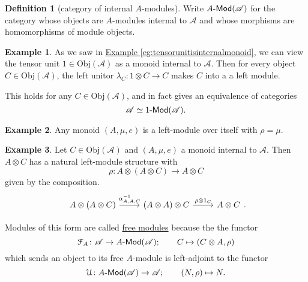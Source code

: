 \documentclass[a4paper,10pt]{scrreprt}
\newcommand{\defn}[1]{\ul{#1}}
\newcommand{\Obj}{\mathrm{Obj}}
\def\mhyp{{\hbox{-}}}
\theoremstyle{definition}
\newtheorem{definition}{Definition}[section]
\newtheorem{example}{Example}[section]
\theoremstyle{plain}
\theoremstyle{remark}
\begin{document}
\begin{definition}[category of internal $A$-modules]
  \label{def:categoryofinternalmodules}
  Write $A\mhyp\mathsf{Mod}(\mathscr{A})$ for the category whose objects are $A$-modules internal to $\mathscr{A}$ and whose morphisms are homomorphisms of module objects.
\end{definition}

\begin{example}
  \label{eg:categoryof1modulesisequivalenttocategoryitself}
  As we saw in \hyperref[eg:tensorunitisinternalmonoid]{Example \ref*{eg:tensorunitisinternalmonoid}}, we can view the tensor unit $1 \in \Obj(\mathscr{A})$ as a monoid internal to $\mathscr{A}$. Then for every object $C \in \Obj(\mathscr{A})$, the left unitor $\lambda_{C}\colon 1 \otimes C \to C$ makes $C$ into a a left module.

  This holds for any $C \in \Obj(\mathscr{A})$, and in fact gives an equivalence of categories
  \begin{equation*}
    \mathscr{A} \simeq 1\mhyp\mathsf{Mod}(\mathscr{A}).
  \end{equation*}
\end{example}

\begin{example}
  \label{eg:anyringisamoduleoveritself}
  Any monoid $(A, \mu, e)$ is a left-module over itself with $\rho = \mu$.
\end{example}

\begin{example}
  \label{eg:freemodule}
  Let $C \in \Obj(\mathscr{A})$ and $(A, \mu, e)$ a monoid internal to $\mathscr{A}$. Then $A \otimes C$ has a natural left-module structure with
  \begin{equation*}
    \rho\colon A \otimes (A \otimes C) \to A \otimes C
  \end{equation*}
  given by the composition.
  \begin{equation*}
    \begin{tikzcd}
      A \otimes (A \otimes C)
      \arrow[r, "{\alpha_{A, A ,C}^{-1}}"]
      & (A \otimes A) \otimes C
      \arrow[r, "\rho \otimes 1_{C}"]
      & A \otimes C
    \end{tikzcd}.
  \end{equation*}

  Modules of this form are called \defn{free modules} because the the functor 
  \begin{equation*}
    \mathcal{F}_{A}\colon \mathscr{A} \to A\mhyp\mathsf{Mod}(\mathscr{A});\qquad C \mapsto (C \otimes A, \rho)
  \end{equation*}
  which sends an object to its free $A$-module is left-adjoint to the functor 
  \begin{equation*}
    \mathcal{U}\colon A\mhyp\mathsf{Mod}(\mathscr{A}) \to \mathscr{A};\qquad (N, \rho) \mapsto N.
  \end{equation*}
\end{example}
\end{document}
